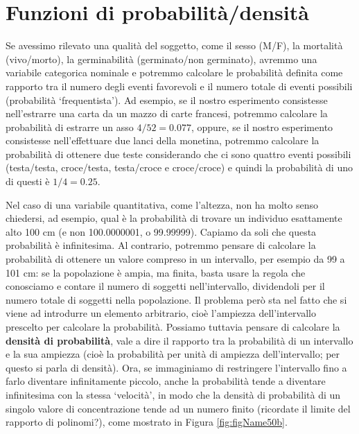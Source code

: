 \documentclass[
  12pt,
]{book}
\begin{document}
\hypertarget{funzioni-di-probabilituxe0densituxe0}{%
\section{Funzioni di probabilità/densità}\label{funzioni-di-probabilituxe0densituxe0}}

Se avessimo rilevato una qualità del soggetto, come il sesso (M/F), la mortalità (vivo/morto), la germinabilità (germinato/non germinato), avremmo una variabile categorica nominale e potremmo calcolare le probabilità definita come rapporto tra il numero degli eventi favorevoli e il numero totale di eventi possibili (probabilità `frequentista'). Ad esempio, se il nostro esperimento consistesse nell'estrarre una carta da un mazzo di carte francesi, potremmo calcolare la probabilità di estrarre un asso \(4/52 = 0.077\), oppure, se il nostro esperimento consistesse nell'effettuare due lanci della monetina, potremmo calcolare la probabilità di ottenere due teste considerando che ci sono quattro eventi possibili (testa/testa, croce/testa, testa/croce e croce/croce) e quindi la probabilità di uno di questi è \(1/4 = 0.25\).

Nel caso di una variabile quantitativa, come l'altezza, non ha molto senso chiedersi, ad esempio, qual è la probabilità di trovare un individuo esattamente alto 100 cm (e non 100.0000001, o 99.99999). Capiamo da soli che questa probabilità è infinitesima. Al contrario, potremmo pensare di calcolare la probabilità di ottenere un valore compreso in un intervallo, per esempio da 99 a 101 cm: se la popolazione è ampia, ma finita, basta usare la regola che conosciamo e contare il numero di soggetti nell'intervallo, dividendoli per il numero totale di soggetti nella popolazione. Il problema però sta nel fatto che si viene ad introdurre un elemento arbitrario, cioè l'ampiezza dell'intervallo prescelto per calcolare la probabilità. Possiamo tuttavia pensare di calcolare la \textbf{densità di probabilità}, vale a dire il rapporto tra la probabilità di un intervallo e la sua ampiezza (cioè la probabilità per unità di ampiezza dell'intervallo; per questo si parla di densità). Ora, se immaginiamo di restringere l'intervallo fino a farlo diventare infinitamente piccolo, anche la probabilità tende a diventare infinitesima con la stessa `velocità', in modo che la densità di probabilità di un singolo valore di concentrazione tende ad un numero finito (ricordate il limite del rapporto di polinomi?), come mostrato in Figura \ref{fig:figName50b}.
\end{document}
